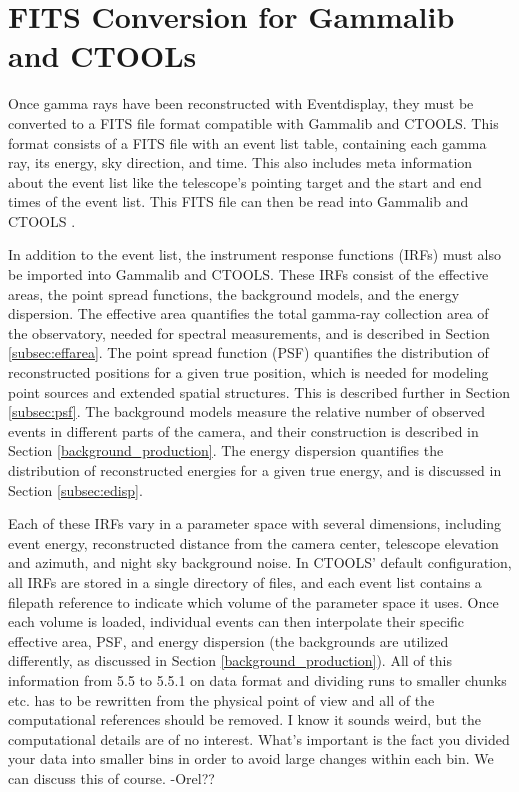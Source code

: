 \section{FITS Conversion for Gammalib and CTOOLs}\label{fitsconversion}
  Once gamma rays have been reconstructed with Eventdisplay, they must be converted to a FITS file format compatible with Gammalib and CTOOLS.
  This format consists of a FITS file with an event list table, containing each gamma ray, its energy, sky direction, and time.
  This also includes meta information about the event list like the telescope's pointing target and the start and end times of the event list.
  This FITS file can then be read into Gammalib and CTOOLS \cite{gammalibctools}.

  In addition to the event list, the instrument response functions (IRFs) must also be imported into Gammalib and CTOOLS.
  These IRFs consist of the effective areas, the point spread functions, the background models, and the energy dispersion.
  The effective area quantifies the total gamma-ray collection area of the observatory, needed for spectral measurements, and is described in Section \ref{subsec:effarea}.
  The point spread function (PSF) quantifies the distribution of reconstructed positions for a given true position, which is needed for modeling point sources and extended spatial structures.
  This is described further in Section \ref{subsec:psf}.
  The background models measure the relative number of observed events in different parts of the camera, and their construction is described in Section \ref{background_production}.
  The energy dispersion quantifies the distribution of reconstructed energies for a given true energy, and is discussed in Section \ref{subsec:edisp}.

  Each of these IRFs vary in a parameter space with several dimensions, including event energy, reconstructed distance from the camera center, telescope elevation and azimuth, and night sky background noise.
  In CTOOLS' default configuration, all IRFs are stored in a single directory of files, and each event list contains a filepath reference to indicate which volume of the parameter space it uses.
  Once each volume is loaded, individual events can then interpolate their specific effective area, PSF, and energy dispersion (the backgrounds are utilized differently, as discussed in Section \ref{background_production}).
  {\color{red}All of this information from 5.5 to 5.5.1 on data format and dividing runs to smaller chunks etc. has to be rewritten from the physical point of view and all of the computational references should be removed. I know it sounds weird, but the computational details are of no interest. What's important is the fact you divided your data into smaller bins in order to avoid large changes within each bin.  We can discuss this of course. -Orel??}

